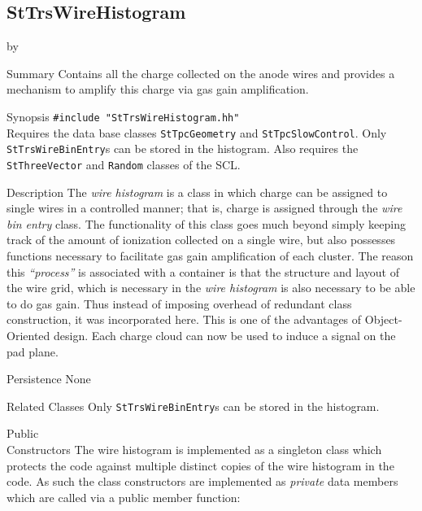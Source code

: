 \documentclass[twoside]{article}
\newcommand{\comp}[1]{\texttt{#1}}%
\newcommand{\entrylabel}[1]{\mbox{\textbf{{#1}}}\hfil}%
\newenvironment{entry}
{\begin{list}{}%
    {\renewcommand{\makelabel}{\entrylabel}%
     \setlength{\labelwidth}{90pt}%
     \setlength{\leftmargin}{\labelwidth}
     \advance\leftmargin by \labelsep%
      }%
    }%
  {\end{list}}
\newcommand{\Entrylabel}[1]%
{\raisebox{0pt}[1ex][0pt]{\makebox[\labelwidth][l]%
    {\parbox[t]{\labelwidth}{\hspace{0pt}\textbf{{#1}}}}}}
\newenvironment{Entry}%
{\renewcommand{\entrylabel}{\Entrylabel}\begin{entry}}%
  {\end{entry}}
\begin{document}
%
%
\subsection{StTrsWireHistogram} 
\label{sec:stTrsWireHistogram}

\begin{Entry}
\item[Summary]
  Contains all the charge collected on the anode wires and provides
  a mechanism to amplify this charge via gas gain amplification.

\item[Synopsis]
  \verb+#include "StTrsWireHistogram.hh"+\\
  Requires the data base classes \comp{StTpcGeometry} and
  \comp{StTpcSlowControl}.  Only \comp{StTrsWireBinEntry}s can
  be stored in the histogram.  Also requires the \comp{StThreeVector}
  and \comp{Random} classes of the SCL.  

\item[Description]
  The {\em wire histogram} is a class in which charge can be assigned to single
  wires in a controlled manner; that is, charge is assigned through the
  {\em wire bin entry} class.  The functionality of this class goes much beyond
  simply keeping track of the amount of ionization collected on a single
  wire, but also possesses functions necessary to facilitate gas gain
  amplification of each cluster.  The reason this {\em ``process''} is associated
  with a container is that the structure and layout of the wire grid,
  which is necessary in the {\em wire histogram} is also necessary to be
  able to do gas gain.  Thus instead of imposing overhead of redundant
  class construction, it was incorporated here.  This is one of the advantages
  of Object-Oriented design.  Each charge cloud can now be used to
  induce a signal on the pad plane.

\item[Persistence]
   None

\item[Related Classes]
  Only \comp{StTrsWireBinEntry}s can be stored in the histogram.

\item[Public \\ Constructors]
  The wire histogram is implemented as a singleton class 
  which protects the code against multiple distinct copies of the
  wire histogram in the code.  As such the class constructors
  are implemented as {\em private} data members which are called
   via a public member function:


\end{Entry}
\end{document}
